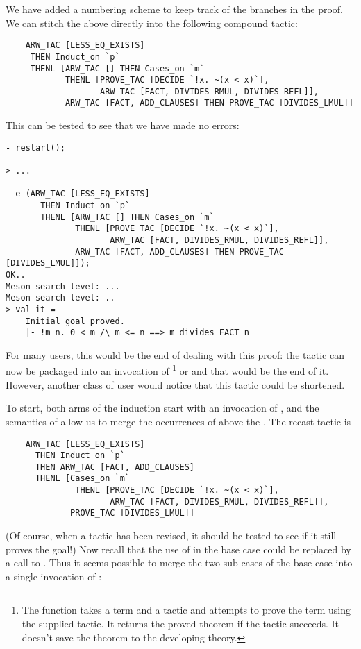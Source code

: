 We have added a numbering scheme to keep track of the branches in the
proof. We can stitch the above directly into the following compound
tactic:

{\small\begin{verbatim}
    ARW_TAC [LESS_EQ_EXISTS]
     THEN Induct_on `p`
     THENL [ARW_TAC [] THEN Cases_on `m`
            THENL [PROVE_TAC [DECIDE `!x. ~(x < x)`],
                   ARW_TAC [FACT, DIVIDES_RMUL, DIVIDES_REFL]],
            ARW_TAC [FACT, ADD_CLAUSES] THEN PROVE_TAC [DIVIDES_LMUL]]
\end{verbatim}}

\noindent This can be tested to see that we have made no errors:

\begin{session}\begin{verbatim}
- restart();

> ...

- e (ARW_TAC [LESS_EQ_EXISTS]
       THEN Induct_on `p`
       THENL [ARW_TAC [] THEN Cases_on `m`
              THENL [PROVE_TAC [DECIDE `!x. ~(x < x)`],
                     ARW_TAC [FACT, DIVIDES_RMUL, DIVIDES_REFL]],
              ARW_TAC [FACT, ADD_CLAUSES] THEN PROVE_TAC [DIVIDES_LMUL]]);
OK..
Meson search level: ...
Meson search level: ..
> val it =
    Initial goal proved.
    |- !m n. 0 < m /\ m <= n ==> m divides FACT n
\end{verbatim}\end{session}
    For many users, this would be the end of dealing with this proof:
    the tactic can now be packaged into an invocation of
    \footnote{The  function takes a term and a
      tactic and attempts to prove the term using the supplied tactic.
      It returns the proved theorem if the tactic succeeds.  It
      doesn't save the theorem to the developing theory.} or
     and that would be the end of it. However, another
    class of user would notice that this tactic could be shortened.

To start, both arms of the induction start with an invocation of
, and the semantics of  allow us to merge the
occurrences of  above the . The recast tactic
is
{\small\begin{verbatim}
    ARW_TAC [LESS_EQ_EXISTS]
      THEN Induct_on `p`
      THEN ARW_TAC [FACT, ADD_CLAUSES]
      THENL [Cases_on `m`
              THENL [PROVE_TAC [DECIDE `!x. ~(x < x)`],
                     ARW_TAC [FACT, DIVIDES_RMUL, DIVIDES_REFL]],
             PROVE_TAC [DIVIDES_LMUL]]
\end{verbatim}}
(Of course, when a tactic has been revised, it should be tested to see
if it still proves the goal!) Now recall that the use of 
in the base case could be replaced by a call to . Thus
it seems possible to merge the two sub-cases of the base case into a
single invocation of :

